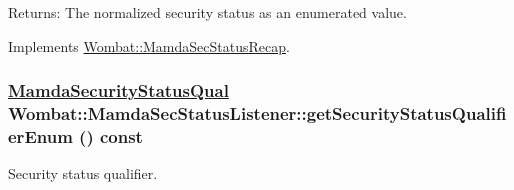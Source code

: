 \begin{Desc}
\item[Returns:]The normalized security status as an enumerated value. \end{Desc}


Implements \hyperlink{classWombat_1_1MamdaSecStatusRecap_79969c1a88df2ff54d7746876cebb653}{Wombat::Mamda\-Sec\-Status\-Recap}.\hypertarget{classWombat_1_1MamdaSecStatusListener_23df8eda9a22fae28680615ce0de4a0f}{
\subsubsection[getSecurityStatusQualifierEnum]{\setlength{\rightskip}{0pt plus 5cm}\hyperlink{namespaceWombat_2de6f22c731ba94169dc24b8054862b8}{Mamda\-Security\-Status\-Qual} Wombat::Mamda\-Sec\-Status\-Listener::get\-Security\-Status\-Qualifier\-Enum () const}}
\label{classWombat_1_1MamdaSecStatusListener_23df8eda9a22fae28680615ce0de4a0f}


Security status qualifier. 

